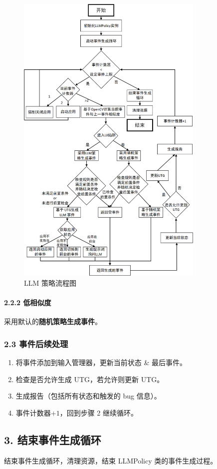 \documentclass{article}[UTF8, fontset=windows]
\begin{document}
\begin{figure}[t!]
    \centering
    \includegraphics[width=0.8\textwidth]{software_practice_1.jpg}
    \caption{LLM 策略流程图}
\end{figure}

\paragraph{2.2.2 低相似度}
采用默认的\textbf{随机策略生成事件}。

\subsubsection*{2.3 事件后续处理}
\begin{enumerate}[leftmargin=2em]
    \item 将事件添加到输入管理器，更新当前状态 \& 最后事件。
    \item 检查是否允许生成 UTG，若允许则更新 UTG。
    \item 生成报告（包括所有状态和触发的 bug 信息）。
    \item 事件计数器$+1$，回到步骤 2 继续循环。
\end{enumerate}

\subsection*{3. 结束事件生成循环}
结束事件生成循环，清理资源，结束 LLMPolicy 类的事件生成过程。
\end{document}
